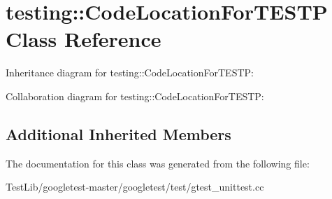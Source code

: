 \hypertarget{classtesting_1_1CodeLocationForTESTP}{}\section{testing\+:\+:Code\+Location\+For\+T\+E\+S\+TP Class Reference}
\label{classtesting_1_1CodeLocationForTESTP}


Inheritance diagram for testing\+:\+:Code\+Location\+For\+T\+E\+S\+TP\+:


Collaboration diagram for testing\+:\+:Code\+Location\+For\+T\+E\+S\+TP\+:
\subsection*{Additional Inherited Members}


The documentation for this class was generated from the following file\+:\begin{DoxyCompactItemize}
\item 
Test\+Lib/googletest-\/master/googletest/test/gtest\+\_\+unittest.\+cc\end{DoxyCompactItemize}
